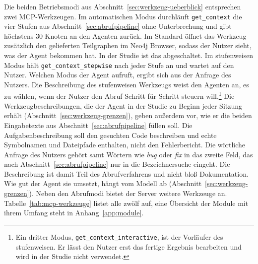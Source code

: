 
Die beiden Betriebsmodi aus Abschnitt~\ref{sec:werkzeug-ueberblick} entsprechen zwei MCP-Werkzeugen. Im automatischen Modus durchläuft \texttt{get\_context} die vier Stufen aus Abschnitt~\ref{sec:abrufpipeline} ohne Unterbrechung und gibt höchstens 30 Knoten an den Agenten zurück. Im Standard öffnet das Werkzeug zusätzlich den gelieferten Teilgraphen im Neo4j Browser, sodass der Nutzer sieht, was der Agent bekommen hat. In der Studie ist das abgeschaltet. Im stufenweisen Modus hält \texttt{get\_context\_stepwise} nach jeder Stufe an und wartet auf den Nutzer. Welchen Modus der Agent aufruft, ergibt sich aus der Anfrage des Nutzers. Die Beschreibung des stufenweisen Werkzeugs weist den Agenten an, es zu wählen, wenn der Nutzer den Abruf Schritt für Schritt steuern will.\footnote{Ein dritter Modus, \texttt{get\_context\_interactive}, ist der Vorläufer des stufenweisen. Er lässt den Nutzer erst das fertige Ergebnis bearbeiten und wird in der Studie nicht verwendet.} Die Werkzeugbeschreibungen, die der Agent in der Studie zu Beginn jeder Sitzung erhält (Abschnitt~\ref{sec:werkzeug-grenzen}), geben außerdem vor, wie er die beiden Eingabetexte aus Abschnitt~\ref{sec:abrufpipeline} füllen soll. Die Aufgabenbeschreibung soll den gesuchten Code beschreiben und echte Symbolnamen und Dateipfade enthalten, nicht den Fehlerbericht. Die wörtliche Anfrage des Nutzers gehört samt Wörtern wie \emph{bug} oder \emph{fix} in das zweite Feld, das nach Abschnitt~\ref{sec:abrufpipeline} nur in die Bezeichnersuche eingeht. Die Beschreibung ist damit Teil des Abrufverfahrens und nicht bloß Dokumentation. Wie gut der Agent sie umsetzt, hängt vom Modell ab (Abschnitt~\ref{sec:werkzeug-grenzen}). Neben den Abrufmodi bietet der Server weitere Werkzeuge an. Tabelle~\ref{tab:mcp-werkzeuge} listet alle zwölf auf, eine Übersicht der Module mit ihrem Umfang steht in Anhang~\ref{app:module}.

